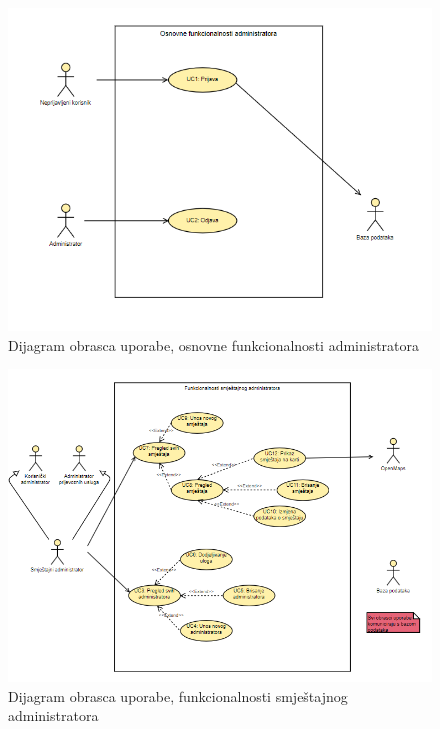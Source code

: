 					\begin{figure}[H]
						\includegraphics[width=\textwidth]{slike/uc1.PNG} %
						\caption{Dijagram obrasca uporabe, osnovne funkcionalnosti administratora}
						\label{fig:uc1} %
					\end{figure}
					
					\begin{figure}[H]
						\includegraphics[width=\textwidth]{slike/uc2.PNG} %
						\caption{Dijagram obrasca uporabe, funkcionalnosti smještajnog administratora}
						\label{fig:uc2} %
					\end{figure}
					
